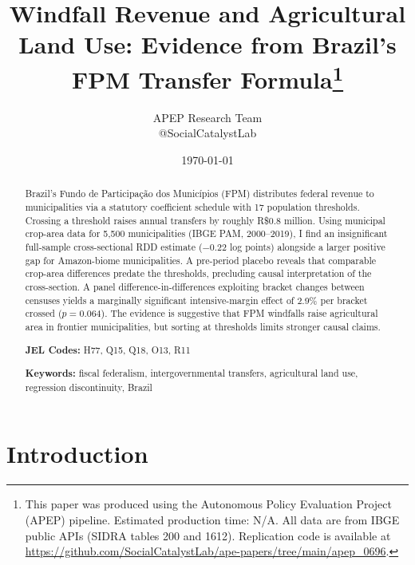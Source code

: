\documentclass[12pt]{article}
\newcommand{\apepcumulativetime}{N/A}
\begin{document}

\title{Windfall Revenue and Agricultural Land Use: Evidence from Brazil's FPM Transfer Formula\thanks{%
This paper was produced using the Autonomous Policy Evaluation Project (APEP) pipeline.
Estimated production time: \apepcumulativetime.
All data are from IBGE public APIs (SIDRA tables 200 and 1612).
Replication code is available at \url{https://github.com/SocialCatalystLab/ape-papers/tree/main/apep_0696}.}}

\author{APEP Research Team \\ @SocialCatalystLab}

\date{\today}

\maketitle

\begin{abstract}
Brazil's Fundo de Participa\c{c}\~{a}o dos Munic\'{i}pios (FPM) distributes federal revenue to municipalities via a statutory coefficient schedule with 17 population thresholds. Crossing a threshold raises annual transfers by roughly R\$0.8 million. Using municipal crop-area data for 5,500 municipalities (IBGE PAM, 2000--2019), I find an insignificant full-sample cross-sectional RDD estimate ($-0.22$ log points) alongside a larger positive gap for Amazon-biome municipalities. A pre-period placebo reveals that comparable crop-area differences predate the thresholds, precluding causal interpretation of the cross-section. A panel difference-in-differences exploiting bracket changes between censuses yields a marginally significant intensive-margin effect of 2.9\% per bracket crossed ($p=0.064$). The evidence is suggestive that FPM windfalls raise agricultural area in frontier municipalities, but sorting at thresholds limits stronger causal claims.

\medskip
\noindent\textbf{JEL Codes:} H77, Q15, Q18, O13, R11

\noindent\textbf{Keywords:} fiscal federalism, intergovernmental transfers, agricultural land use, regression discontinuity, Brazil
\end{abstract}

\label{apep_main_text_start}

\section{Introduction}
\end{document}
